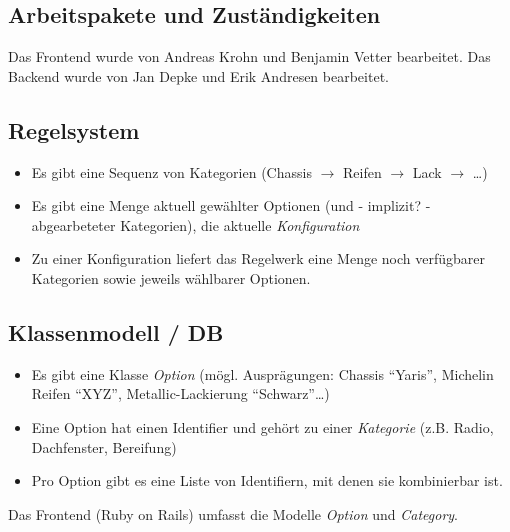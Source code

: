\documentclass[a4paper,10pt]{article}
\begin{document}
\subsection*{Arbeitspakete und Zuständigkeiten}

Das Frontend wurde von Andreas Krohn und Benjamin Vetter bearbeitet.
Das Backend wurde von Jan Depke und Erik Andresen bearbeitet.
 
\subsection*{Regelsystem}

\begin{itemize}
 \item Es gibt eine Sequenz von Kategorien (Chassis $\rightarrow$ Reifen $\rightarrow$ Lack $\rightarrow$ \ldots)
 \item Es gibt eine Menge aktuell gewählter Optionen (und - implizit? - abgearbeteter Kategorien), die aktuelle \emph{Konfiguration}
 \item Zu einer Konfiguration liefert das Regelwerk eine Menge noch verfügbarer Kategorien sowie jeweils wählbarer Optionen.
\end{itemize}

\subsection*{Klassenmodell / DB}

\begin{itemize}
 \item Es gibt eine Klasse \emph{Option} (mögl. Ausprägungen: Chassis "`Yaris"', Michelin Reifen "`XYZ"', Metallic-Lackierung "`Schwarz"'\ldots)
 \item Eine Option hat einen Identifier und gehört zu einer \emph{Kategorie} (z.B. Radio, Dachfenster, Bereifung)
 \item Pro Option gibt es eine Liste von Identifiern, mit denen sie kombinierbar ist.
\end{itemize}

Das Frontend (Ruby on Rails) umfasst die Modelle \textit{Option} und \textit{Category}.
\end{document}
